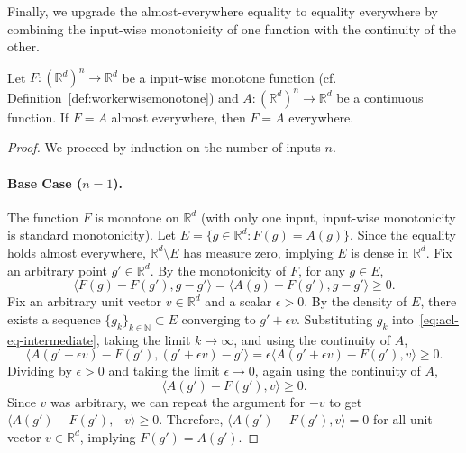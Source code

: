 \documentclass[twoside,11pt]{article}
\newcommand{\R}{\mathbb{R}}
\begin{document}
Finally, we upgrade the almost-everywhere equality to equality everywhere by combining the input-wise monotonicity of one function with the continuity of the other.
\begin{lemma}\label{lem:ACL-equal-everywhere}
Let $F: (\mathbb{R}^d)^n \to \mathbb{R}^d$ be a input-wise monotone function (cf. Definition~\ref{def:workerwisemonotone}) and $A: (\mathbb{R}^d)^n \to \mathbb{R}^d$ be a continuous function.
If $F = A$ almost everywhere, then $F = A$ everywhere.
\end{lemma}
\begin{proof}
We proceed by induction on the number of inputs $n$.

\paragraph{Base Case ($n=1$).}
The function $F$ is monotone on $\mathbb{R}^d$ (with only one input, input-wise monotonicity is standard monotonicity). 
Let $E = \{g \in \mathbb{R}^d : F(g) = A(g)\}$. 
Since the equality holds almost everywhere, $\mathbb{R}^d \setminus E$ has measure zero, implying $E$ is dense in $\mathbb{R}^d$.
Fix an arbitrary point $g' \in \mathbb{R}^d$.
By the monotonicity of $F$, for any $g \in E$,
\begin{equation}\label{eq:acl-eq-intermediate}
  \langle F(g) - F(g'), g - g' \rangle = \langle A(g) - F(g'), g - g' \rangle \geq 0. 
\end{equation}
Fix an arbitrary unit vector $v \in \mathbb{R}^d$ and a scalar $\epsilon > 0$.
By the density of $E$, there exists a sequence $\{ g_k \}_{k \in \mathbb{N}} \subset E$ converging to $g' + \epsilon v$.
Substituting $g_k$ into~\eqref{eq:acl-eq-intermediate}, taking the limit $k \to \infty$, and using the continuity of $A$,
\[ 
  \langle A(g' + \epsilon v) - F(g'), (g' + \epsilon v) - g' \rangle = \epsilon \langle A(g' + \epsilon v) - F(g'), v \rangle \geq 0. 
\]
Dividing by $\epsilon > 0$ and taking the limit $\epsilon \to 0$, again using the continuity of $A$,
\[ 
  \langle A(g') - F(g'), v \rangle \ge 0. 
\]
Since $v$ was arbitrary, we can repeat the argument for $-v$ to get $\langle A(g') - F(g'), -v \rangle \geq 0$.
Therefore, $\langle A(g') - F(g'), v \rangle = 0$ for all unit vector $v\in\R^d$, implying $F(g') = A(g')$.

\end{proof}
\end{document}
